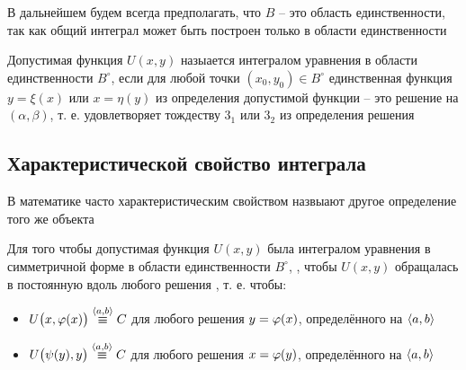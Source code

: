 В дальнейшем будем всегда предполагать, что $ B $ -- это область единственности, так как общий интеграл может быть построен только в области единственности

\begin{definition}
    Допустимая функция $ U(x, y) $ назыается интегралом уравнения  в области единственности $ B^\circ $, если для любой точки $ (x_0, y_0) \in B^\circ $ единственная функция $ y = \xi(x) $ или $ x = \eta(y) $ из определения допустимой функции -- это решение  на $ (\alpha, \beta) $, т. е. удовлетворяет тождеству $ 3_1 $ или $ 3_2 $ из определения решения
\end{definition}

\subsection{Характеристической свойство интеграла}

\begin{note}
	В математике часто характеристическим свойством назвыают другое определение того же объекта
\end{note}

\begin{theorem}
    Для того чтобы допустимая функция $ U(x, y) $ была интегралом уравнения в симметричной форме  в области единственности $ B^\circ $, , чтобы $ U(x, y) $ обращалась в постоянную вдоль любого решения , т. е. чтобы:
    \begin{itemize}
        \item $ U \big( x, \vphi(x) \big) \overset{\braket{a, b}}\equiv C $ для любого решения $ y = \varphi(x) $, определённого на $ \Braket{a, b} $
        \item $ U \big( \psi(y), y \big) \overset{\braket{a, b}}\equiv C $ для любого решения $ x = \varphi(y) $, определённого на $ \Braket{a, b} $
    \end{itemize}
\end{theorem}


